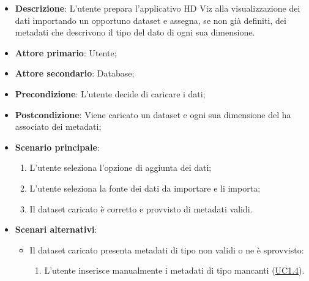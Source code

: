 \begin{itemize}
    \item \textbf{Descrizione}: L'utente prepara l'applicativo HD Viz alla visualizzazione dei dati importando un opportuno dataset e assegna, se non già definiti, dei metadati che descrivono il tipo del dato di ogni sua dimensione.
	
    \item \textbf{Attore primario}: Utente;
    \item \textbf{Attore secondario}: Database;
    
    
    \item \textbf{Precondizione}:   L'utente decide di caricare i dati;

    \item \textbf{Postcondizione}:  Viene caricato un dataset e ogni sua dimensione del ha associato
                                    dei metadati;

	\item \textbf{Scenario principale}:
		\begin{enumerate}
			\item L'utente seleziona l'opzione di aggiunta dei dati;
            \item L'utente seleziona la fonte dei dati da importare e li importa;
            \item Il dataset caricato è corretto e provvisto di metadati validi.
        \end{enumerate}
   
    \item \textbf{Scenari alternativi}:
		\begin{itemize}
            \item Il dataset caricato presenta metadati di tipo non validi o ne è sprovvisto:
            \begin{enumerate}
                \item L'utente inserisce manualmente i metadati di tipo mancanti (\hyperref[ssub:uc1.4]{UC1.4}).
            \end{enumerate}
        \end{itemize}
\end{itemize}

